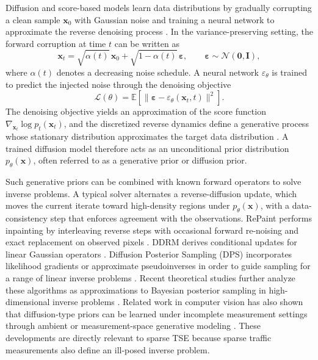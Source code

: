 \documentclass[a4paper,fleqn]{cas-sc}
\numberwithin{equation}{section}
\begin{document}
Diffusion and score-based models learn data distributions by gradually corrupting a clean sample $\mathbf{x}_0$ with Gaussian noise and training a neural network to approximate the reverse denoising process \citep{ho2020denoising, song2020score}. In the variance-preserving setting, the forward corruption at time $t$ can be written as
\begin{equation}
    \mathbf{x}_t = \sqrt{\alpha(t)}\,\mathbf{x}_0 + \sqrt{1-\alpha(t)}\,\boldsymbol{\varepsilon},
    \qquad
    \boldsymbol{\varepsilon}\sim\mathcal{N}(\mathbf{0},\mathbf{I}),
\end{equation}
where $\alpha(t)$ denotes a decreasing noise schedule. A neural network $\varepsilon_\theta$ is trained to predict the injected noise through the denoising objective
\begin{equation}
    \mathcal{L}(\theta)
    = \mathbb{E}\!\left[\|\boldsymbol{\varepsilon}-\varepsilon_\theta(\mathbf{x}_t,t)\|^2\right].
\end{equation}
The denoising objective yields an approximation of the score function $\nabla_{\mathbf{x}_t}\log p_t(\mathbf{x}_t)$, and the discretized reverse dynamics define a generative process whose stationary distribution approximates the target data distribution \citep{song2020score, ho2020denoising}. A trained diffusion model therefore acts as an unconditional prior distribution $p_\theta(\mathbf{x})$, often referred to as a generative prior or diffusion prior.

Such generative priors can be combined with known forward operators to solve inverse problems. A typical solver alternates a reverse-diffusion update, which moves the current iterate toward high-density regions under $p_\theta(\mathbf{x})$, with a data-consistency step that enforces agreement with the observations. RePaint performs inpainting by interleaving reverse steps with occasional forward re-noising and exact replacement on observed pixels \citep{lugmayr2022repaint}. DDRM derives conditional updates for linear Gaussian operators \citep{kawar2022denoising}. Diffusion Posterior Sampling (DPS) incorporates likelihood gradients or approximate pseudoinverses in order to guide sampling for a range of linear inverse problems \citep{song2021solving, chung2022score, chung2023diffusion}. Recent theoretical studies further analyze these algorithms as approximations to Bayesian posterior sampling in high-dimensional inverse problems \citep{chung2023diffusion}. Related work in computer vision has also shown that diffusion-type priors can be learned under incomplete measurement settings through ambient or measurement-space generative modeling \citep{daras2023ambient}. These developments are directly relevant to sparse TSE because sparse traffic measurements also define an ill-posed inverse problem.
\end{document}
